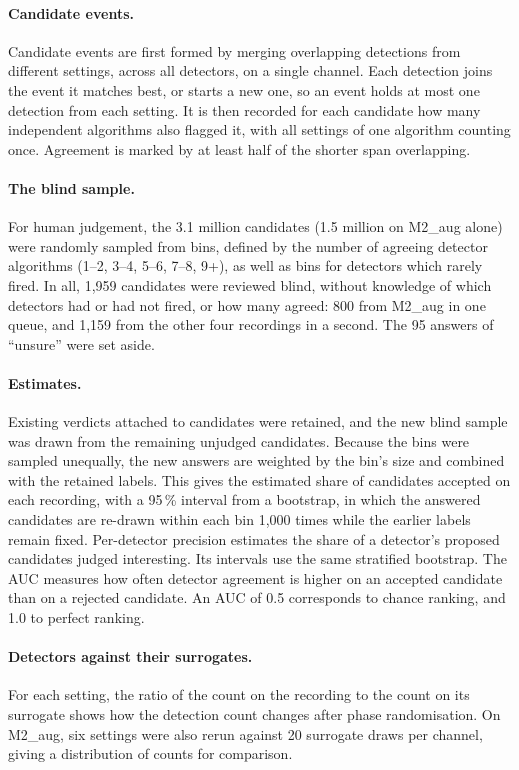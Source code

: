 \paragraph{Candidate events.} Candidate events are first formed by merging overlapping detections from different settings, across all detectors, on a single channel. Each detection joins the event it matches best, or starts a new one, so an event holds at most one detection from each setting. It is then recorded for each candidate how many independent algorithms also flagged it, with all settings of one algorithm counting once. Agreement is marked by at least half of the shorter span overlapping.

\paragraph{The blind sample.} For human judgement, the 3.1 million candidates (1.5 million on M2\_aug alone) were randomly sampled from bins, defined by the number of agreeing detector algorithms (1--2, 3--4, 5--6, 7--8, 9+), as well as bins for detectors which rarely fired. In all, 1,959 candidates were reviewed blind, without knowledge of which detectors had or had not fired, or how many agreed: 800 from M2\_aug in one queue, and 1,159 from the other four recordings in a second. The 95 answers of ``unsure'' were set aside.

\paragraph{Estimates.} Existing verdicts attached to candidates were retained, and the new blind sample was drawn from the remaining unjudged candidates. Because the bins were sampled unequally, the new answers are weighted by the bin's size and combined with the retained labels. This gives the estimated share of candidates accepted on each recording, with a 95\,\% interval from a bootstrap, in which the answered candidates are re-drawn within each bin 1,000 times while the earlier labels remain fixed. Per-detector precision estimates the share of a detector's proposed candidates judged interesting. Its intervals use the same stratified bootstrap. The AUC measures how often detector agreement is higher on an accepted candidate than on a rejected candidate. An AUC of 0.5 corresponds to chance ranking, and 1.0 to perfect ranking.

\paragraph{Detectors against their surrogates.} For each setting, the ratio of the count on the recording to the count on its surrogate shows how the detection count changes after phase randomisation. On M2\_aug, six settings were also rerun against 20 surrogate draws per channel, giving a distribution of counts for comparison.

